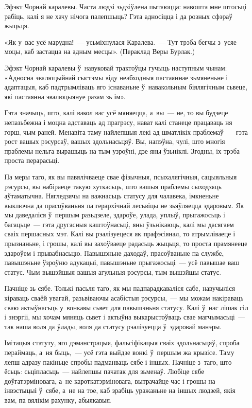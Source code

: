 Эфэкт Чорнай каралевы. Часта людзі зьдзіўлена пытаюцца: навошта мне штосьці рабіць, калі я не хачу нічога палепшыць? Гэта адносіцца і да розных сфэраў жыцьця. 

«Як у~вас усё марудна!~--- усьміхнулася Каралева.~--- Тут трэба бегчы з~усяе моцы, каб застацца на адным месцы». (Пераклад Веры Бурлак.)

Эфэкт Чорнай каралевы ў~навуковай трактоўцы гучыць наступным чынам: «Адносна эвалюцыйнай сыстэмы віду неабходныя пастаяннае зьмяненьне і адаптацыя, каб падтрымліваць яго існаваньне ў~навакольным біялягічным сьвеце, які пастаянна эвалюцыянуе разам зь ім».

Гэта значыць, што, калі вакол вас усё мяняецца, а~вы~--- не, то вы будзеце непазьбежна і моцна адставаць ад прагрэсу, нават калі станеце працаваць ня горш, чым раней. Менавіта таму найлепшыя лекі ад шматлікіх праблемаў~--- гэта рост вашых рэсурсаў, вашых здольнасьцяў. Вы, напэўна, чулі, што многія праблемы нельга вырашыць на тым узроўні, дзе яны ўзьніклі. Згодны, іх трэба проста перарасьці. 

Па меры таго, як вы павялічваеце свае фізычныя, псыхалягічныя, сацыяльныя рэсурсы, вы набіраеце такую хуткасьць, што вашыя праблемы сыходзяць аўтаматычна. Нягледзячы на важнасьць статусу для чалавека, імкненьне выключна да прасоўваньня па герархічнай лесьвіцы не зьяўляецца здаровым. Як мы даведаліся ў~першым разьдзеле, здароўе, улада, уплыў, прыгажосьць і багацьце~--- гэта другасныя каштоўнасьці, яны ўзьнікаюць, калі мы дасягаем сваіх першасных мэт. Калі вы рэалізуецеся як прафэсіянал, то атрымліваеце і прызнаньне, і грошы, калі вы захоўваеце радасьць жыцьця, то проста прамянееце здароўем і прывабнасьцю. Павышэньне даходаў, прасоўваньне па службе, павышэньне ўзроўню адукацыі, павышэньне прыгажосьці~--- усё павышае ваш статус. Чым вышэйшыя вашыя агульныя рэсурсы, тым вышэйшы статус.

Пачніце зь сябе. Толькі пасьля таго, як мы падпарадкаваліся сабе, навучыліся кіраваць сваёй увагай, разьвіваючы асабістыя рэсурсы,~--- мы можам накіраваць сваю актыўнасьць у~вонкавы сьвет для павышэньня статусу. Калі ў~нас лішак сіл і энэргіі, мы хочам мяняць сьвет і актыўна выкарыстоўваць свае магчымасьці~--- так наша воля да ўлады, воля да статусу рэалізуецца ў~здаровай манэры.

Імітацыя статуту, яго дэманстрацыя, фальсіфікацыя сваіх здольнасьцяў, спроба пераймаць, а~ня быць,~--- усё гэта выйдзе вонкі ў~першым жа крызісе. Таму лепш адразу пакіньце спробы падманваць сябе і іншых. Пачніце з~таго, што ёсьць: сьціпласьць~--- найлепшы пачатак для зьменаў. Любіце сябе доўгатэрміновага, а~не кароткатэрміновага, вытрачайце час і грошы на інвэстыцыі ў~сябе, а~не на тое, каб зрабіць уражаньне на іншых людзей, якія вам, па вялікім рахунку, абыякавыя.

